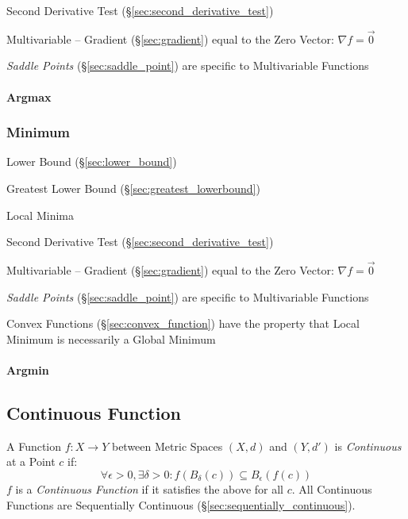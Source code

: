 Second Derivative Test (\S\ref{sec:second_derivative_test})

Multivariable -- Gradient (\S\ref{sec:gradient}) equal to the Zero Vector:
$\nabla{f} = \vec{0}$

\fist \emph{Saddle Points} (\S\ref{sec:saddle_point}) are specific to
Multivariable Functions



\paragraph{Argmax}\label{sec:argmax}\hfill



\subsubsection{Minimum}\label{sec:minimum}

Lower Bound (\S\ref{sec:lower_bound})

Greatest Lower Bound (\S\ref{sec:greatest_lowerbound})

Local Minima

Second Derivative Test (\S\ref{sec:second_derivative_test})

Multivariable -- Gradient (\S\ref{sec:gradient}) equal to the Zero Vector:
$\nabla{f} = \vec{0}$

\fist \emph{Saddle Points} (\S\ref{sec:saddle_point}) are specific to
Multivariable Functions

Convex Functions (\S\ref{sec:convex_function}) have the property that Local
Minimum is necessarily a Global Minimum



\paragraph{Argmin}\label{sec:argmin}\hfill



\subsection{Continuous Function}\label{sec:continuous_function}

A Function $f : X \rightarrow Y$ between Metric Spaces $(X,d)$ and $(Y,d')$ is
\emph{Continuous} at a Point $c$ if:
\[
  \forall \epsilon > 0, \exists \delta > 0 :
  f (B_{\delta}(c)) \subseteq B_{\epsilon}(f(c))
\]
$f$ is a \emph{Continuous Function} if it satisfies the above for all $c$. All
Continuous Functions are Sequentially Continuous
(\S\ref{sec:sequentially_continuous}).

